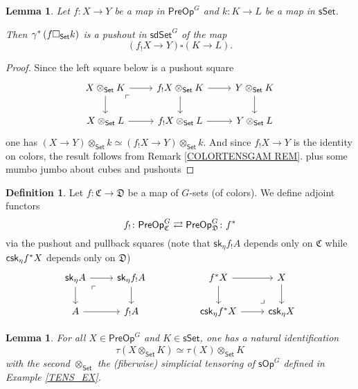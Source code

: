 \documentclass[a4paper,10pt
,draft
]{article}%
\numberwithin{equation}{section}
\numberwithin{figure}{section}
\newtheorem{lemma}[equation]{Lemma}%
\theoremstyle{definition} %
\newtheorem{definition}[equation]{Definition}%
\newcommand{\sSet}{\ensuremath{\mathsf{sSet}}}%
\newcommand{\sOp}{\ensuremath{\mathsf{sOp}}}%
\newcommand{\1}{\ensuremath{\mathbbm 1}}%
\begin{document}
\begin{lemma}\label{OTIMSETPUSH LEM}
	Let $f\colon X \to Y$ be a map in $\mathsf{PreOp}^G$
	and $k \colon K \to L$ be a map in $\mathsf{sSet}$.

	Then $\gamma^{\**}\left(f \square_{\mathsf{Set}} k\right)$
	is a pushout in $\mathsf{sdSet}^G$
	of the map
\[
	\left(f_! X \to Y\right)
	\square
	\left( K \to L \right).
\]
\end{lemma}


\begin{proof}
Since the left square below is a pushout square
\[
\begin{tikzcd}
	X \otimes_{\mathsf{Set}} K \ar{r} \ar{d} 
	\arrow[dr, phantom, "\ulcorner", very near start]
&
	f_! X \otimes_{\mathsf{Set}} K \ar{r} \ar{d} 
&
	Y \otimes_{\mathsf{Set}} K \ar{d}
\\
	X \otimes_{\mathsf{Set}} L \ar{r} 
&
	f_! X \otimes_{\mathsf{Set}} L \ar{r} 
&
	Y \otimes_{\mathsf{Set}} L
\end{tikzcd}
\]
one has
$(X \to Y) \otimes_{\mathsf{Set}} k \simeq 
(f_!X \to Y) \otimes_{\mathsf{Set}} k$.
And since $f_!X \to Y$ is the identity on colors,
the result follows from Remark \ref{COLORTENSGAM REM}.
	{\color{blue} plus some mumbo jumbo about cubes and pushouts}
\end{proof}



\begin{definition}
	Let $f \colon \mathfrak{C} \to \mathfrak{D}$
	be a map of $G$-sets (of colors).
	We define adjoint functors
	\[
	f_{!} \colon
	\mathsf{PreOp}^{G}_{\mathfrak{C}}
	\rightleftarrows
	\mathsf{PreOp}^{G}_{\mathfrak{D}}
	\colon f^{\**}
	\]
	via the pushout and pullback squares
	(note that $\mathsf{sk}_{\eta} f_! A$ depends only on 
	$\mathfrak{C}$ while 
	$\mathsf{csk}_{\eta} f^{\**} X$ depends only on
	$\mathfrak{D}$)
	\[
	\begin{tikzcd}
	\mathsf{sk}_{\eta} A \ar{r} \ar{d} \arrow[dr, phantom, "\ulcorner", very near start]  &
	\mathsf{sk}_{\eta} f_! A \ar{d}
	&&
	f^{\**} X \ar{r} \ar{d} &
	X \ar{d}
	\\
	A \ar{r} & 
	f_! A
	&&
	\mathsf{csk}_{\eta} f^{\**} X \ar{r} & 
	\mathsf{csk}_{\eta} X
	\arrow[ul, phantom, "\lrcorner", very near start]
	\end{tikzcd}
	\]
\end{definition}





\begin{lemma}\label{TAUOTIMES_LEM}
	For all $X \in \mathsf{PreOp}^G$ and $K \in \sSet$, 
	one has a natural identification
	\[\tau(X \otimes_{\mathsf{Set}} K) \simeq \tau(X) \otimes_{\mathsf{Set}} K\]
	with the second $\otimes_{\mathsf{Set}}$ the (fiberwise) simplicial tensoring of $\sOp^G$ defined in Example \ref{TENS_EX}.
\end{lemma}
\end{document}
